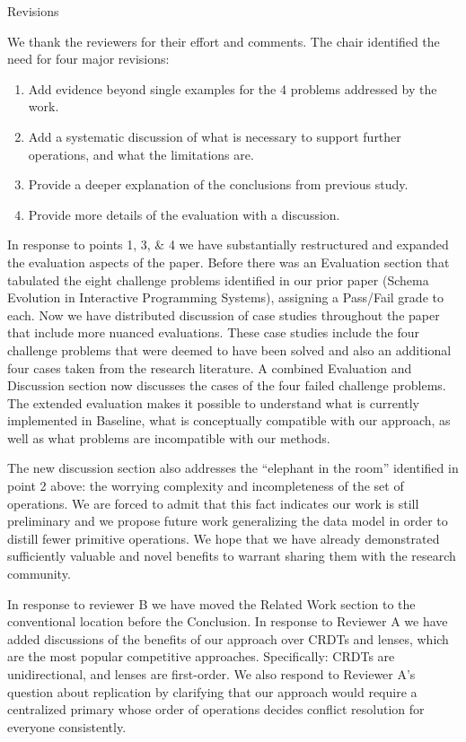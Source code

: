 \documentclass[11pt]{article}
\begin{document}
\begin{center}
{\LARGE Revisions}
\end{center}

\hfill\break


We thank the reviewers for their effort and comments. The chair identified the need for four major revisions:

\begin{enumerate}
\item Add evidence beyond single examples for the 4 problems addressed by the work.
\item Add a systematic discussion of what is necessary to support further operations, and what the limitations are.
\item Provide a deeper explanation of the conclusions from previous study.
\item Provide more details of the evaluation with a discussion.
\end{enumerate}

In response to points 1, 3, \& 4 we have substantially restructured and expanded the evaluation aspects of the paper. Before there was an Evaluation section that tabulated the eight challenge problems identified in our prior paper (Schema Evolution in Interactive Programming Systems), assigning a Pass/Fail grade to each. Now we have distributed discussion of case studies throughout the paper that include more nuanced evaluations. These case studies include the four challenge problems that were deemed to have been solved and also an additional four cases taken from the research literature.  A combined Evaluation and Discussion section now discusses the cases of the four failed challenge problems. The extended evaluation makes it possible to understand what is currently implemented in Baseline, what is conceptually compatible with our approach, as well as what problems are incompatible with our methods.

The new discussion section also addresses the ``elephant in the room'' identified in point 2 above: the worrying complexity and incompleteness of the set of operations. We are forced to admit that this fact indicates our work is still preliminary and we propose future work generalizing the data model in order to distill fewer primitive operations. We hope that we have already demonstrated sufficiently valuable and novel benefits to warrant sharing them with the research community.

In response to reviewer B we have moved the Related Work section to the conventional location before the Conclusion. In response to Reviewer A we have added discussions of the benefits of our approach over CRDTs and lenses, which are the most popular competitive approaches. Specifically: CRDTs are unidirectional, and lenses are first-order. We also respond to Reviewer A's question about replication by clarifying that our approach would require a centralized primary whose order of operations decides conflict resolution for everyone consistently.
\end{document}
